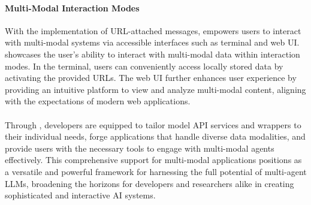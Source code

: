 \paragraph{Multi-Modal Interaction Modes}
With the implementation of URL-attached messages, \ours empowers users to interact with multi-modal systems via accessible interfaces such as terminal and web UI.   showcases the user's ability to interact with multi-modal data within interaction modes. 
In the terminal, users can conveniently access locally stored data by activating the provided URLs. The web UI further enhances user experience by providing an intuitive platform to view and analyze multi-modal content, aligning with the expectations of modern web applications.

\paragraph{} Through \ours, developers are equipped to tailor model API services and wrappers to their individual needs, forge applications that handle diverse data modalities, and provide users with the necessary tools to engage with multi-modal agents effectively. This comprehensive support for multi-modal applications positions \ours as a versatile and powerful framework for harnessing the full potential of multi-agent LLMs, broadening the horizons for developers and researchers alike in creating sophisticated and interactive AI systems.
